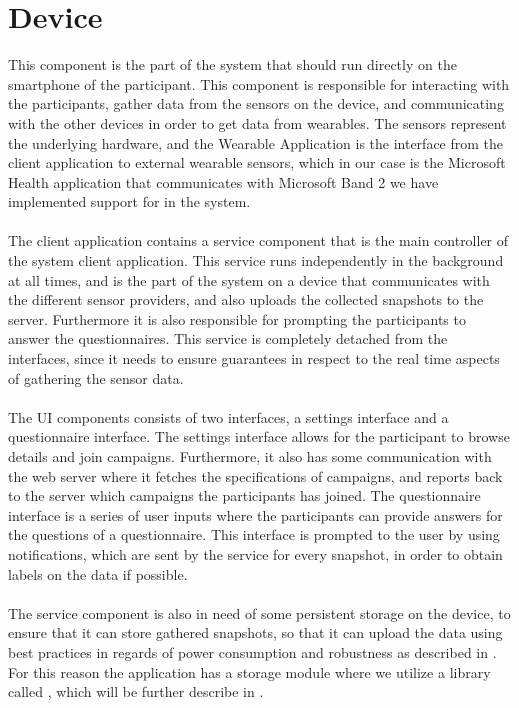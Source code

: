 
\section{Device}
\label{sec:device}
This component is the part of the system that should run directly on the smartphone of the participant. This component is responsible for interacting with the participants, gather data from the sensors on the device, and communicating with the other devices in order to get data from wearables. The sensors represent the underlying hardware, and the Wearable Application is the interface from the client application to external wearable sensors, which in our case is the Microsoft Health application that communicates with Microsoft Band 2 we have implemented support for in the system.
\\\\
The client application contains a service component that is the main controller of the system client application. This service runs independently in the background at all times, and is the part of the system on a device that communicates with the different sensor providers, and also uploads the collected snapshots to the server. Furthermore it is also responsible for prompting the participants to answer the questionnaires. This service is completely detached from the interfaces, since it needs to ensure guarantees in respect to the real time aspects of gathering the sensor data.
\\\\
The UI components consists of two interfaces, a settings interface and a questionnaire interface. The settings interface allows for the participant to browse details and join campaigns. Furthermore, it also has some communication with the web server where it fetches the specifications of campaigns, and reports back to the server which campaigns the participants has joined. The questionnaire interface is a series of user inputs where the participants can provide answers for the questions of a questionnaire. This interface is prompted to the user by using notifications, which are sent by the service for every snapshot, in order to obtain labels on the data if possible.
\\\\
The service component is also in need of some persistent storage on the device, to ensure that it can store gathered snapshots, so that it can upload the data using best practices in regards of power consumption and robustness as described in . For this reason the application has a storage module where we utilize a library called , which will be further describe in .
